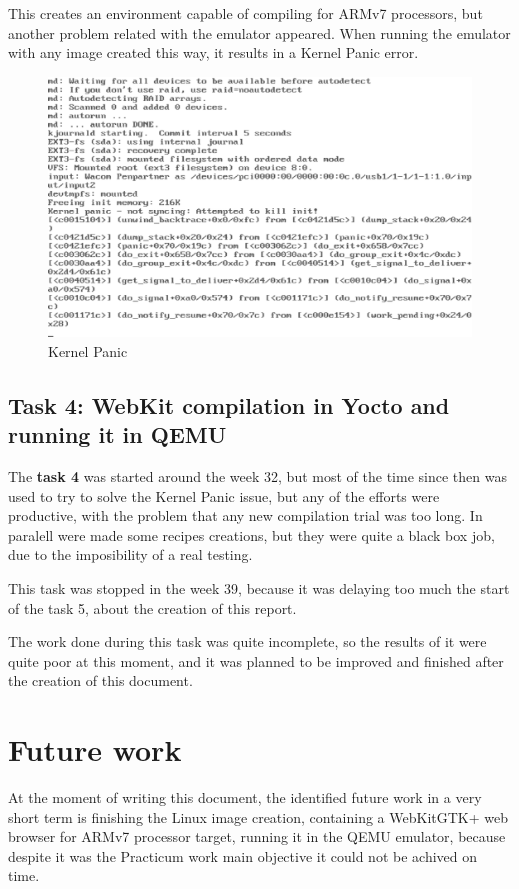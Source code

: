 \documentclass[a4paper,11pt,openany]{report}
\begin{document}
This creates an environment capable of compiling for ARMv7 processors, but another problem related with the emulator appeared. When running the emulator with any image created this way, it results in a Kernel Panic error.

\begin{figure}[hbtp]
\centering
\includegraphics[scale=1]{kernel_panic.eps}
\caption{Kernel Panic}
\end{figure}

\section{Task 4: WebKit compilation in Yocto and running it in QEMU}
The \textbf{task 4} was started around the week 32, but most of the time since then was used to try to solve the Kernel Panic issue, but any of the efforts were productive, with the problem that any new compilation trial was too long. In paralell were made some recipes creations, but they were quite a black box job, due to the imposibility of a real testing.

This task was stopped in the week 39, because it was delaying too much the start of the task 5, about the creation of this report.

The work done during this task was quite incomplete, so the results of it were quite poor at this moment, and it was planned to be improved and finished after the creation of this document.

\chapter{Future work}
At the moment of writing this document, the identified future work in a very short term is finishing the Linux image creation, containing a WebKitGTK+ web browser for ARMv7 processor target, running it in the QEMU emulator, because despite it was the Practicum work main objective it could not be achived on time.
\end{document}

